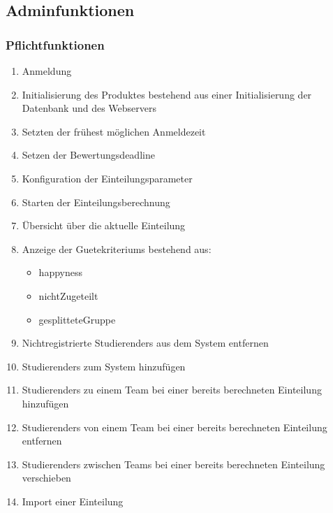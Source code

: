 \documentclass[parskip=full]{scrartcl}
\newcommand{\swtLabel}[1]{\textbf{/#1\arabic*0/}}
\begin{document}
\subsection{Adminfunktionen}

\subsubsection{Pflichtfunktionen}

\begin{enumerate}[label=\swtLabel{FA}, resume]
  \item Anmeldung \label{FAadminanmeldung}
  \item Initialisierung des Produktes bestehend aus einer Initialisierung der
  Datenbank und des Webservers
  \label{FAinit}
  \item Setzten der frühest möglichen Anmeldezeit \label{FAadminanmeldezeit}
  \item Setzen der Bewertungsdeadline \label{FAadmindeadline}
  \item Konfiguration der Einteilungsparameter \label{FAadminparameter} %
  \item Starten der Einteilungsberechnung \label{FAadminEinteilungstart}
  \item Übersicht über die aktuelle Einteilung \label{FAadminÜbersicht}
  \item Anzeige der \glspl{Guetekriterium} bestehend aus:
    \begin{itemize}
      \item \gls{happyness}
      \item \gls{nichtZugeteilt}
      \item \gls{gesplitteteGruppe}
    \end{itemize} \label{FAadminGüte}
  \item Nichtregistrierte \glspl{Studierender} aus dem System entfernen \label{FAadmin+Stud}
  \item \glspl{Studierender} zum System hinzufügen \label{FAadmin-Stud}
  \item \glspl{Studierender} zu einem \gls{Team} bei einer bereits berechneten Einteilung hinzufügen
  \item \glspl{Studierender} von einem \gls{Team} bei einer bereits berechneten Einteilung entfernen
  \item \glspl{Studierender} zwischen \glspl{Team} bei einer bereits berechneten Einteilung verschieben 
  \item Import einer Einteilung \label{FAimport}

\end{enumerate}
\end{document}
